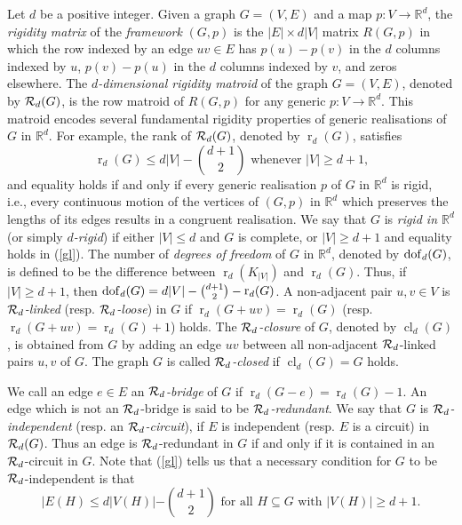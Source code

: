 \documentclass[11pt,a4paper]{article}
\theoremstyle{definition}
\DeclareMathOperator{\rr}{r}
\DeclareMathOperator{\cl}{cl}
\newcommand{\dof}{{\rm dof}}
\newcommand{\R}{\mathbb{R}}
\begin{document}
Let $d$ be a positive integer. Given a graph  $G=(V,E)$ and a map $p:V\to \R^d$, the {\em rigidity matrix} of the {\em framework} $(G,p)$ is the $|E|\times d|V|$ matrix $R(G,p)$ in which the row indexed by an edge $uv\in E$ has $p(u)-p(v)$ in the $d$ columns indexed by $u$, $p(v)-p(u)$ in the $d$ columns indexed by $v$, and zeros elsewhere.
The {\it $d$-dimensional rigidity matroid} of the graph $G=(V,E)$, denoted by ${\cal R}_d(G)$,
is  the row matroid of $R(G,p)$ for any generic $p:V\to \R^d$.
This matroid encodes several fundamental rigidity properties of 
generic realisations of 
$G$ in $\R^d$. 
For example, the rank of ${\cal R}_d(G)$, denoted by $\rr_d(G)$, satisfies
\begin{equation}
\label{gl}
\rr_d(G)\leq d|V|-\binom{d+1}{2} \mbox{ whenever $|V|\geq d+1$,}
\end{equation}
and equality holds if and only if every generic realisation $p$ of $G$ in $\R^d$ is rigid, i.e., every continuous motion of the vertices of $(G,p)$ in $\R^d$ which preserves the lengths of its edges results in a congruent realisation.
We say that $G$ is {\it rigid in $\R^d$} (or simply {\it $d$-rigid}) if either $|V|\leq d$ and
$G$ is complete, or $|V|\geq d+1$ and equality holds in (\ref{gl}).
The number of
{\it degrees of freedom} of $G$ in $\R^d$, denoted by $\dof_d(G)$, is defined to be the
difference between $\rr_d(K_{|V|})$ and $\rr_d(G)$.
Thus, if $|V|\geq d+1$, then $\dof_d(G)=d|V|-\binom{d+1}{2}-\rr_d(G)$.
A non-adjacent pair $u,v\in V$ is {\it ${\cal R}_d$-linked} (resp.
{\it ${\cal R}_d$-loose}) in $G$ 
if $\rr_d(G+uv)=\rr_d(G)$ (resp. $\rr_d(G+uv)=\rr_d(G)+1$) holds.
The {\it ${\cal R}_d$-closure} of $G$, denoted by $\cl_d(G)$, is 
obtained from $G$
by adding an edge $uv$ between all non-adjacent ${\cal R}_d$-linked pairs $u,v$ of $G$.
The graph $G$ is called
{\it ${\cal R}_d$-closed} if $\cl_d(G)=G$ holds.



We call an edge $e\in E$ an {\itshape ${\cal R}_d$-bridge} of $G$
if $\rr_d(G-e)=\rr_d(G)-1$. An edge which is not an ${\cal R}_d$-bridge is said to be {\em ${\cal R}_d$-redundant}. We say that $G$ is 
{\itshape ${\cal R}_d$-independent} (resp. 
an 
{\itshape ${\cal R}_d$-circuit}), 
if $E$ is independent (resp.
$E$ is a circuit) in ${\cal R}_d(G)$. Thus an edge is
${\cal R}_d$-redundant in $G$ if and only if it is  contained
in an ${\cal R}_d$-circuit in $G$. Note that (\ref{gl}) tells us that a necessary condition for $G$ to be ${\cal R}_d$-independent is that 
\begin{equation}
\label{ind}
|E(H)\leq d|V(H)|-\binom{d+1}{2} \mbox{ for all $H\subseteq G$ with $|V(H)|\geq d+1$.}
\end{equation}
\end{document}
